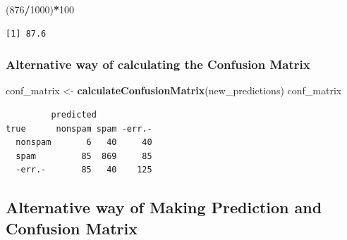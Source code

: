 \documentclass[
]{article}
\newenvironment{Shaded}{\begin{snugshade}}{\end{snugshade}}
\newcommand{\AttributeTok}[1]{\textcolor[rgb]{0.13,0.29,0.53}{#1}}
\newcommand{\CommentTok}[1]{\textcolor[rgb]{0.56,0.35,0.01}{\textit{#1}}}
\newcommand{\DecValTok}[1]{\textcolor[rgb]{0.00,0.00,0.81}{#1}}
\newcommand{\FunctionTok}[1]{\textcolor[rgb]{0.13,0.29,0.53}{\textbf{#1}}}
\newcommand{\NormalTok}[1]{#1}
\newcommand{\OtherTok}[1]{\textcolor[rgb]{0.56,0.35,0.01}{#1}}
\newcommand{\SpecialCharTok}[1]{\textcolor[rgb]{0.81,0.36,0.00}{\textbf{#1}}}
\begin{document}
\begin{Shaded}
\begin{Highlighting}[]
\NormalTok{(}\DecValTok{876}\SpecialCharTok{/}\DecValTok{1000}\NormalTok{)}\SpecialCharTok{*}\DecValTok{100}
\end{Highlighting}
\end{Shaded}

\begin{verbatim}
[1] 87.6
\end{verbatim}

\subsubsection{Alternative way of calculating the Confusion
Matrix}\label{alternative-way-of-calculating-the-confusion-matrix}

\begin{Shaded}
\begin{Highlighting}[]
\NormalTok{conf\_matrix }\OtherTok{\textless{}{-}} \FunctionTok{calculateConfusionMatrix}\NormalTok{(new\_predictions)}
\NormalTok{conf\_matrix}
\end{Highlighting}
\end{Shaded}

\begin{verbatim}
         predicted
true      nonspam spam -err.-
  nonspam       6   40     40
  spam         85  869     85
  -err.-       85   40    125
\end{verbatim}

\subsection{Alternative way of Making Prediction and Confusion
Matrix}\label{alternative-way-of-making-prediction-and-confusion-matrix}

\begin{Shaded}
\end{Shaded}
\end{document}
